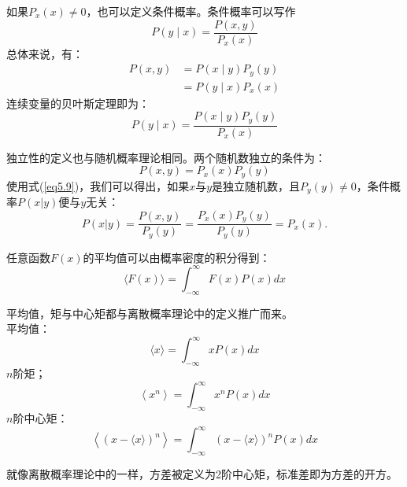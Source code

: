 \documentclass[UTF8]{ctexart}
\numberwithin{equation}{section}%
\numberwithin{figure}{section}%
\begin{document}
    如果$P_x(x)\neq 0$，也可以定义条件概率。条件概率可以写作
    \begin{equation}
        P(y \mid x)=\frac{P(x, y)}{P_{x}(x)}
    \end{equation}
    总体来说，有：
    \begin{equation}\label{eq5.9}
    \begin{aligned}
        P(x, y) &=P(x \mid y) P_{y}(y) \\
        &=P(y \mid x) P_{x}(x)
        \end{aligned}
    \end{equation}
    连续变量的贝叶斯定理即为：
    \begin{equation}\label{eq5.10}
        P(y \mid x)=\frac{P(x \mid y) P_{y}(y)}{P_{x}(x)}
    \end{equation}

    独立性的定义也与随机概率理论相同。两个随机数独立的条件为：
    \begin{equation}
        P(x, y)=P_{x}(x) P_{y}(y)
    \end{equation}
    使用式(\ref{eq5.9})，我们可以得出，如果$x$与$y$是独立随机数，且$P_y(y)\neq 0$，条件概率$P(x|y)$便与$y$无关：
    \begin{equation}
        P(x| y)=\frac{P(x, y)}{P_{y}(y)}=\frac{P_{x}(x) P_{y}(y)}{P_{y}(y)}=P_{x}(x).
    \end{equation}

    任意函数$F(x)$的平均值可以由概率密度的积分得到：
    \begin{equation}
        \langle F(x)\rangle=\int_{-\infty}^{\infty} F(x) P(x) d x
    \end{equation}
    
    平均值，矩与中心矩都与离散概率理论中的定义推广而来。\\
    平均值：
    \begin{equation}
        \langle x\rangle=\int_{-\infty}^{\infty} x P(x) d x
    \end{equation}
    $n$阶矩；
    \begin{equation}
    \left\langle x^{n}\right\rangle=\int_{-\infty}^{\infty} x^{n} P(x) d x
    \end{equation}
    $n$阶中心矩：
    \begin{equation}
        \left\langle(x-\langle x\rangle)^{n}\right\rangle=\int_{-\infty}^{\infty}(x-\langle x\rangle)^{n} P(x) d x
    \end{equation}

    就像离散概率理论中的一样，方差被定义为2阶中心矩，标准差即为方差的开方。
\end{document}
